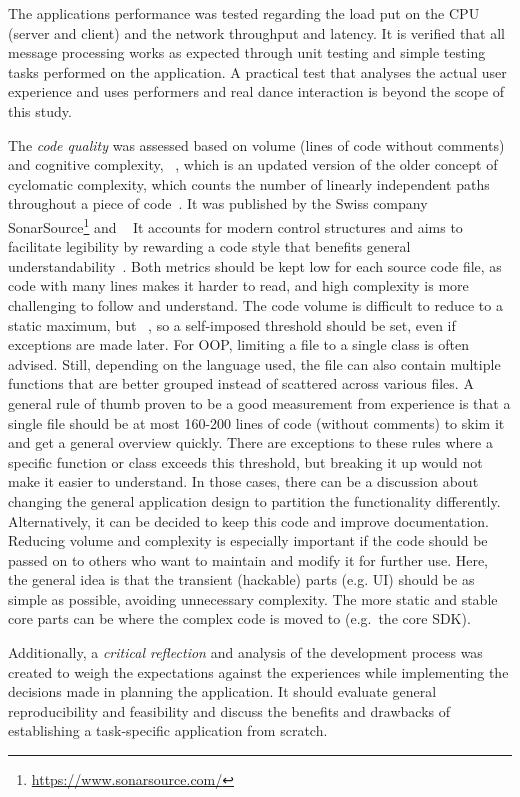 The application\textquotesingle s performance was tested regarding the load put on the \ac{CPU} (server and client) and the network throughput and latency.
It is verified that all message processing works as expected through unit testing and simple testing tasks performed on the application.
A practical test that analyses the actual user experience and uses performers and real dance interaction is beyond the scope of this study.

The \emph{code quality} was assessed based on volume (lines of code without comments) and cognitive complexity, ~\parencite[see][]{sonarSourceCognitiveComplexity}, which is an updated version of the older concept of cyclomatic complexity, which counts the number of linearly independent paths throughout a piece of code~\parencite[see][]{mcCabeComplexity}.
It was published by the Swiss company SonarSource\footnote{\url{https://www.sonarsource.com/}} and ~\parencite[4]{sonarSourceCognitiveComplexity}
It accounts for modern control structures and aims to facilitate legibility by rewarding a code style that benefits general understandability~\parencite[4]{sonarSourceCognitiveComplexity}.
Both metrics should be kept low for each source code file, as code with many lines makes it harder to read, and high complexity is more challenging to follow and understand.
The code volume is difficult to reduce to a static maximum, but ~\parencite[6]{softwareMetricsReliability}, so a self-imposed threshold should be set, even if exceptions are made later.
For \ac{OOP}, limiting a file to a single class is often advised.
Still, depending on the language used, the file can also contain multiple functions that are better grouped instead of scattered across various files.
A general rule of thumb proven to be a good measurement from experience is that a single file should be at most 160-200 lines of code (without comments) to skim it and get a general overview quickly.
There are exceptions to these rules where a specific function or class exceeds this threshold, but breaking it up would not make it easier to understand.
In those cases, there can be a discussion about changing the general application design to partition the functionality differently.
Alternatively, it can be decided to keep this code and improve documentation.
Reducing volume and complexity is especially important if the code should be passed on to others who want to maintain and modify it for further use.
Here, the general idea is that the transient (hackable) parts (e.g. \ac{UI}) should be as simple as possible, avoiding unnecessary complexity.
The more static and stable core parts can be where the complex code is moved to (e.g.\ the core \ac{SDK}).

Additionally, a \emph{critical reflection} and analysis of the development process was created to weigh the expectations against the experiences while implementing the decisions made in planning the application.
It should evaluate general reproducibility and feasibility and discuss the benefits and drawbacks of establishing a task-specific application from scratch.
